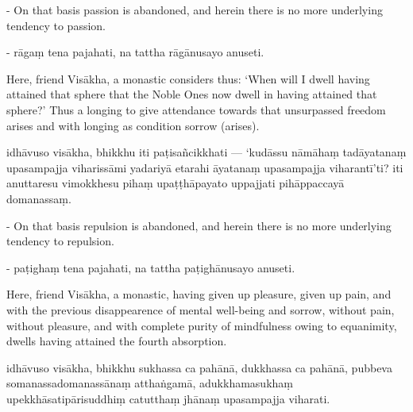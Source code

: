 \begin{samepage}
\begin{leftcolumn*}
- On that basis passion is abandoned, and herein there is no more underlying tendency to passion.
\end{leftcolumn*}

\begin{rightcolumn}
- rāgaṃ tena pajahati, na tattha rāgānusayo anuseti.
\end{rightcolumn}
\end{samepage}

\begin{samepage}
\begin{leftcolumn*}
Here, friend Visākha, a monastic considers thus: ‘When will I dwell having attained that sphere that the Noble Ones now dwell in having attained that sphere?’ Thus a longing to give attendance towards that unsurpassed freedom arises and with longing as condition sorrow (arises).
\end{leftcolumn*}

\begin{rightcolumn}
idhāvuso visākha, bhikkhu iti paṭisañcikkhati — ‘kudāssu nāmāhaṃ tadāyatanaṃ upasampajja viharissāmi yadariyā etarahi āyatanaṃ upasampajja viharantī’ti? iti anuttaresu vimokkhesu pihaṃ upaṭṭhāpayato uppajjati pihāppaccayā domanassaṃ.
\end{rightcolumn}
\end{samepage}

\begin{samepage}
\begin{leftcolumn*}
- On that basis repulsion is abandoned, and herein there is no more underlying tendency to repulsion.
\end{leftcolumn*}

\begin{rightcolumn}
- paṭighaṃ tena pajahati, na tattha paṭighānusayo anuseti.
\end{rightcolumn}
\end{samepage}

\begin{samepage}
\begin{leftcolumn*}
Here, friend Visākha, a monastic, having given up pleasure, given up pain, and with the previous disappearence of mental well-being and sorrow, without pain, without pleasure, and with complete purity of mindfulness owing to equanimity, dwells having attained the fourth absorption.
\end{leftcolumn*}

\begin{rightcolumn}
idhāvuso visākha, bhikkhu sukhassa ca pahānā, dukkhassa ca pahānā, pubbeva somanassadomanassānaṃ atthaṅgamā, adukkhamasukhaṃ upekkhāsatipārisuddhiṃ catutthaṃ jhānaṃ upasampajja viharati.
\end{rightcolumn}
\end{samepage}

